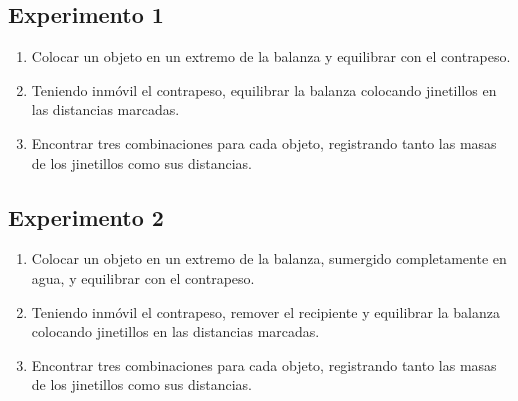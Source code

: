 \documentclass[../main]{subfiles}
\begin{document}
\subsection{Experimento 1}
\begin{enumerate}
  \item Colocar un objeto en un extremo de la balanza y equilibrar con el contrapeso.
  \item Teniendo inmóvil el contrapeso, equilibrar la balanza colocando jinetillos en las distancias marcadas.
  \item Encontrar tres combinaciones para cada objeto, registrando tanto las masas de los jinetillos como sus distancias.
\end{enumerate}
\subsection{Experimento 2}
\begin{enumerate}
  \item Colocar un objeto en un extremo de la balanza, sumergido completamente en agua, y equilibrar con el contrapeso.
  \item Teniendo inmóvil el contrapeso, remover el recipiente y equilibrar la balanza colocando jinetillos en las distancias marcadas.
  \item Encontrar tres combinaciones para cada objeto, registrando tanto las masas de los jinetillos como sus distancias.
\end{enumerate}
\end{document}

